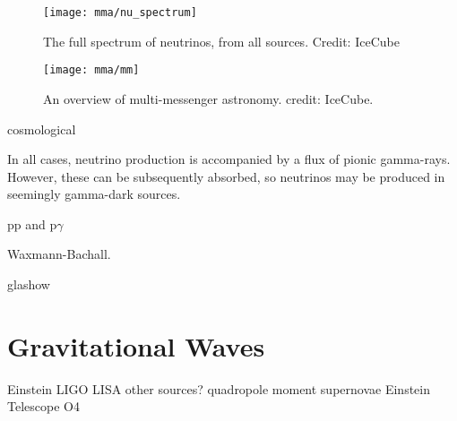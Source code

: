\begin{figure}[!ht]
	\texttt{[image: mma/nu\_spectrum]}
	\caption{The full spectrum of neutrinos, from all sources. Credit: IceCube}
	\label{fig:nu_spectrum}
\end{figure}

\begin{figure}[!ht]
	\centering \texttt{[image: mma/mm]}
	\caption{An overview of multi-messenger astronomy. credit: IceCube.}
	\label{fig:mm}
\end{figure}

cosmological

In all cases, neutrino production is accompanied by a flux of pionic gamma-rays. However, these can be subsequently absorbed, so neutrinos may be produced in seemingly gamma-dark sources.

pp and p$\gamma$

Waxmann-Bachall.

glashow

\section{Gravitational Waves}

Einstein
LIGO
LISA
other sources?
quadropole moment
supernovae
Einstein Telescope
O4